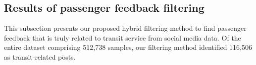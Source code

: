 \documentclass[a4paper,fleqn,12pt]{cas-sc}
\begin{document}



\subsection{Results of passenger feedback filtering}
This subsection presents our proposed hybrid filtering method to find passenger feedback that is truly related to transit service from social media data. Of the entire dataset comprising 512,738 samples, our filtering method identified 116,506 as transit-related posts. 
\end{document}
